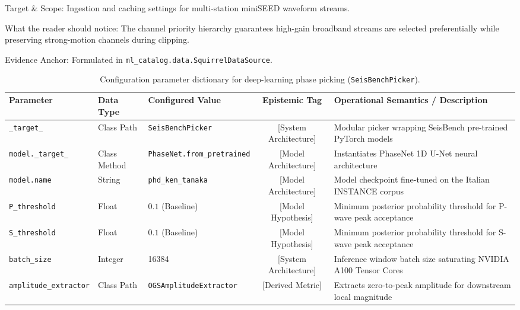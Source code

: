 \begin{table}[htbp]
\begin{threeparttable}
\begin{tablenotes}[flushleft]
      \item Target \& Scope: Ingestion and caching settings for multi-station miniSEED waveform streams.
      \item What the reader should notice: The channel priority hierarchy guarantees high-gain broadband streams are selected preferentially while preserving strong-motion channels during clipping.
      \item Evidence Anchor: Formulated in \texttt{ml\_catalog.data.SquirrelDataSource}.
    \end{tablenotes}
  \end{threeparttable}
\end{table}

\begin{table}[htbp]
  \centering
  \small
  \caption{Configuration parameter dictionary for deep-learning phase picking (\texttt{SeisBenchPicker}).}
  \label{tab:app_picker_dictionary}
  \begin{threeparttable}
    \begin{tabularx}{\linewidth}{l l l c X}
      \toprule
      \textbf{Parameter} & \textbf{Data Type} & \textbf{Configured Value} & \textbf{Epistemic Tag} & \textbf{Operational Semantics / Description} \\
      \midrule
      \texttt{\_target\_} & Class Path & \texttt{SeisBenchPicker} & [System Architecture] & Modular picker wrapping SeisBench pre-trained PyTorch models \\
      \texttt{model.\_target\_} & Class Method & \texttt{PhaseNet.from\_pretrained} & [Model Architecture] & Instantiates PhaseNet 1D U-Net neural architecture \\
      \texttt{model.name} & String & \texttt{phd\_ken\_tanaka} & [Model Architecture] & Model checkpoint fine-tuned on the Italian INSTANCE corpus \\
      \texttt{P\_threshold} & Float & $0.1$ (Baseline) & [Model Hypothesis] & Minimum posterior probability threshold for P-wave peak acceptance \\
      \texttt{S\_threshold} & Float & $0.1$ (Baseline) & [Model Hypothesis] & Minimum posterior probability threshold for S-wave peak acceptance \\
      \texttt{batch\_size} & Integer & \num{16384} & [System Architecture] & Inference window batch size saturating NVIDIA A100 Tensor Cores \\
      \texttt{amplitude\_extractor} & Class Path & \texttt{OGSAmplitudeExtractor} & [Derived Metric] & Extracts zero-to-peak amplitude for downstream local magnitude \\

\end{tabularx}
\end{threeparttable}
\end{table}
